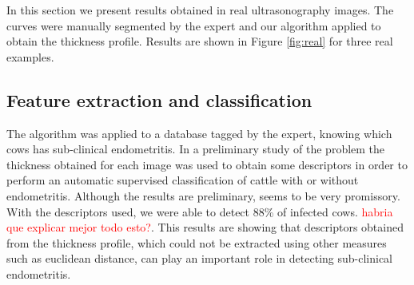 \documentclass{article}
\begin{document}
In this section we present results obtained in real ultrasonography images. The curves were manually segmented by the expert and our algorithm applied to obtain the thickness profile. Results are shown in Figure \ref{fig:real} for three real examples.

\subsection{Feature extraction and classification}
\label{ssec:clasification}
The algorithm was applied to a database tagged by the expert, knowing which cows has sub-clinical endometritis. In a preliminary study of the problem the thickness obtained for each image was used to obtain some descriptors in order to perform an automatic supervised classification of cattle with or without endometritis. Although the results are preliminary, seems to be very promissory. With the descriptors used, we were able to detect 88\% of infected cows. \textcolor{red}{habria que explicar mejor todo esto?}. This results are showing that descriptors obtained from the thickness profile, which could not be extracted using other measures such as euclidean distance, can play an important role in detecting sub-clinical endometritis.
\end{document}

